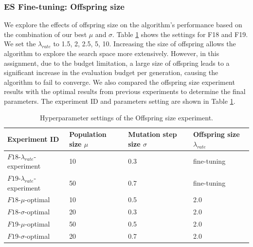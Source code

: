 \documentclass{article}
\begin{document}
\subsubsection{ES Fine-tuning: Offspring size}

We explore the effects of offspring size on the algorithm's performance based on the combination of our best $\mu$ and $\sigma$. Table \ref{tab:al-es-os-hyper} shows the settings for F18 and F19. We set the $\lambda_{rate}$ to 1.5, 2, 2.5, 5, 10. Increasing the size of offspring allows the algorithm to explore the search space more extensively. However, in this assignment, due to the budget limitation, a large size of offspring leads to a significant increase in the evaluation budget per generation, causing the algorithm to fail to converge. We also compared the offspring size experiment results with the optimal results from previous experiments to determine the final parameters. The experiment ID and parameters setting are shown in Table \ref{tab:al-es-os-hyper}.


\begin{table}[!ht]
    \centering
    \caption{Hyperparameter settings of the Offspring size experiment.}
    \label{tab:al-es-os-hyper}
    \begin{tabular}{llll}
       \toprule
       \textbf{Experiment ID} & \textbf{Population size $\mu$} & \textbf{Mutation step size $\sigma$} & \textbf{Offspring size $\lambda_{rate}$}\\
       \midrule
       $F18$-$\lambda_{rate}$-experiment & 10 & 0.3 & fine-tuning\\
       $F19$-$\lambda_{rate}$-experiment & 50 & 0.7 & fine-tuning\\
       $F18$-$\mu$-optimal & 10 & 0.5 & 2.0\\
       $F18$-$\sigma$-optimal & 20 & 0.3 & 2.0\\
       $F19$-$\mu$-optimal & 50 & 0.5 & 2.0\\
       $F19$-$\sigma$-optimal & 20 & 0.7 & 2.0\\
       
       \bottomrule
    \end{tabular}
\end{table}
\end{document}
